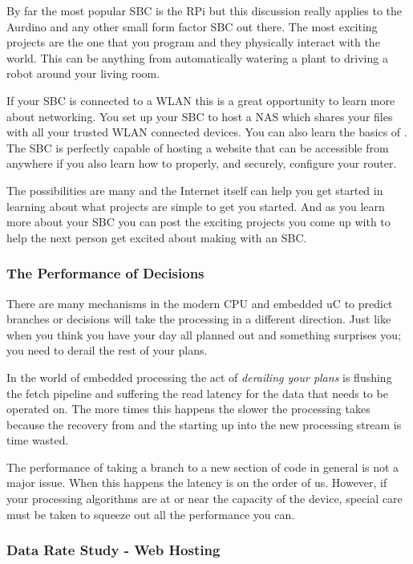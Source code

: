 By far the most popular \ac{SBC} is the \ac{RPi} \cite{rpiorg} but this discussion really applies to the Aurdino \cite{arduinoref} and any other small form factor \ac{SBC} out there. The most exciting projects are the one that you program and they physically interact with the world. This can be anything from automatically watering a plant to driving a robot around your living room.

If your \ac{SBC} is connected to a \ac{WLAN} this is a great opportunity to learn more about networking. You set up your \ac{SBC} to host a \ac{NAS} which shares your files with all your trusted \ac{WLAN} connected devices. You can also learn the basics of . The \ac{SBC} is perfectly capable of hosting a website that can be accessible from anywhere if you also learn how to properly, and securely, configure your router.

The possibilities are many and the Internet itself can help you get started in learning about what projects are simple to get you started. And as you learn more about your \ac{SBC} you can post the exciting projects you come up with to help the next person get excited about making with an \ac{SBC}.
	
\subsubsection{The Performance of Decisions}

There are many mechanisms in the modern \ac{CPU} and embedded \ac{uC} to predict branches or decisions will take the processing in a different direction. Just like when you think you have your day all planned out and something surprises you; you need to derail the rest of your plans.

In the world of embedded processing the act of \emph{derailing your plans} is flushing the fetch pipeline and suffering the read latency for the data that needs to be operated on. The more times this happens the slower the processing takes because the recovery from and the starting up into the new processing stream is time wasted.

The performance of taking a branch to a new section of code in general is not a major issue. When this happens the latency is on the order of \ac{us}. However, if your processing algorithms are at or near the capacity of the device, special care must be taken to squeeze out all the performance you can.
	
\subsubsection{Data Rate Study - Web Hosting}

